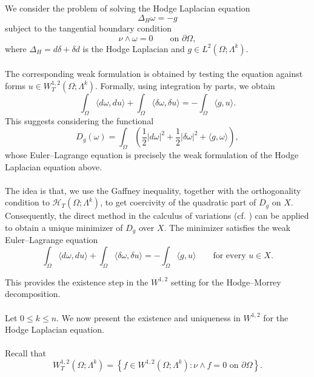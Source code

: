 We consider the problem of solving the Hodge Laplacian equation
\[
    \Delta_H\omega=-g
\]
subject to the tangential boundary condition
\[
    \nu\wedge\omega=0
    \qquad\text{on }\partial\Omega,
\]
where $\Delta_H=d\delta+\delta d$ is the Hodge Laplacian and
$g\in L^2(\Omega;\Lambda^k)$.
\\\\ The corresponding weak formulation is obtained by testing the equation
against forms $u\in W_T^{1,2}(\Omega;\Lambda^k)$. Formally, using
integration by parts, we obtain
\[
    \int_\Omega\langle d\omega,du\rangle
    +
    \int_\Omega\langle\delta\omega,\delta u\rangle
    =
    -\int_\Omega\langle g,u\rangle.
\]
This suggests considering the functional
\[
    D_g(\omega)
    =
    \int_\Omega
    \left(
        \frac12|d\omega|^2
        +
        \frac12|\delta\omega|^2
        +
        \langle g,\omega\rangle
    \right),
\]
whose Euler--Lagrange equation is precisely the weak formulation of
the Hodge Laplacian equation above.
\\\\ The idea is that, we use the Gaffney inequality, together with the orthogonality condition to
$\mathcal{H}_T(\Omega;\Lambda^k)$, to get coercivity of the quadratic
part of $D_g$ on $X$. Consequently, the direct method in the calculus
of variations (cf. \cite{Dacorogna2008}) can be applied to obtain a unique minimizer of $D_g$
over $X$. The minimizer satisfies the weak Euler--Lagrange equation
\[
    \int_\Omega\langle d\omega,du\rangle
    +
    \int_\Omega\langle\delta\omega,\delta u\rangle
    =
    -\int_\Omega\langle g,u\rangle
    \qquad\text{for every }u\in X.
\]

This provides the existence step in the $W^{1,2}$ setting for the
Hodge--Morrey decomposition.
\\\\ Let $0\leq k\leq n$. We now present the existence and uniqueness in
$W^{1,2}$ for the Hodge Laplacian equation. 
\\\\ Recall that
\[
    W_T^{1,2}(\Omega;\Lambda^k)
    =
    \left\{
        f\in W^{1,2}(\Omega;\Lambda^k)
        : \nu\wedge f=0\text{ on }\partial\Omega
    \right\}.
\]

